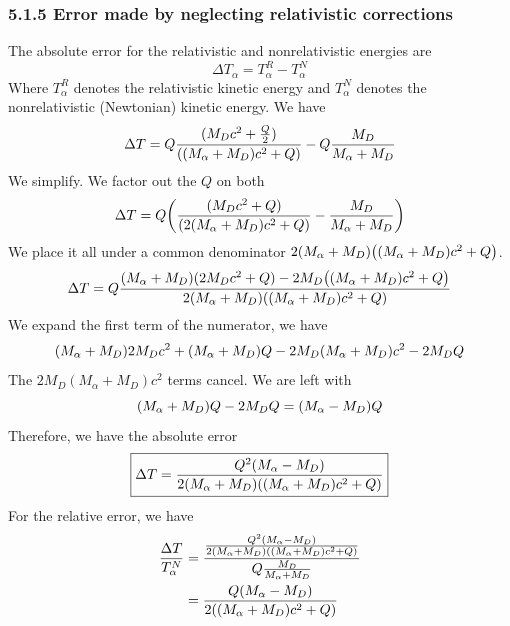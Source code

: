 \documentclass[12pt,a4paper]{article}
\begin{document}
\begin{solution_pset}
		\subsubsection*{5.1.5 Error made by neglecting relativistic corrections}
			\nocite{flores2026}
			The absolute error for the relativistic and nonrelativistic energies are
			\[
				\Delta T_\alpha = T_\alpha^R - T_\alpha^N
			\]
			Where $T_\alpha^R$ denotes the relativistic kinetic energy and $T_\alpha^N$
			denotes the nonrelativistic (Newtonian) kinetic energy. We have
			\[
				\Delta T = 
				Q
				\frac{
					(M_D c^2+\frac{Q}{2})
				}{
					\pqty{
						(M_\alpha + M_D)c^2 +Q
					} 
				} 
				-
				Q
				\frac{
					M_D
				}{
					M_\alpha + M_D
				} 
			\]
			We simplify. We factor out the $Q$ on both
			\[
				\Delta T =
				Q
				\pqty{
					\frac{
						(M_D c^2+Q)
					}{
						\pqty{
							2(M_\alpha + M_D)c^2 +Q
						} 
					} 
					-
					\frac{
						M_D
					}{
						M_\alpha + M_D
					} 
				}
			\]
			We place it all under a common denominator 
			$2(M_\alpha + M_D)\pqty{(M_\alpha + M_D) c^2 +Q}$.
			\[
				\Delta T =
				Q
				\frac{
						(M_\alpha + M_D)(2M_D c^2 +Q) - 2M_D
						\pqty{
							(M_\alpha + M_D) 
							c^2
							+
							Q
						}
					}{
						2(M_\alpha + M_D)\pqty{(M_\alpha + M_D) c^2 +Q}
				} 
			\]
			We expand the first term of the numerator, we have
			\[
				\pqty{
					M_\alpha 
					+
					M_D
				}
				2 M_D c^2
				+
				\pqty{
					M_\alpha 
					+
					M_D
				}
				Q
				-
				2M_D
				\pqty{
					M_\alpha 
					+
					M_D
				}
				c^2
				-
				2M_D Q
			\]
			The $2 M_D(M_\alpha + M_D)c^2$ terms cancel. We are left with
			\[
				\pqty{
					M_\alpha 
					+
					M_D
				}
				Q
				-
				2M_D Q
				=
				\pqty{
					M_\alpha 
					-
					M_D
				}
				Q
			\]
			Therefore, we have the absolute error
			\[
				\boxed{
					\Delta T 
					=
					\frac{
						Q^2
						\pqty{
							M_\alpha 
							-
							M_D
						}
					}{
						2(M_\alpha + M_D)\pqty{(M_\alpha + M_D) c^2 +Q}
					} 
				}
			\]
			For the relative error, we have
			\begin{align*}
				\frac{\Delta T}{T_\alpha^N} 
				&=
				\frac{
					\frac{
						Q^2
						\pqty{
							M_\alpha 
							-
							M_D
						}
					}{
						2(M_\alpha + M_D)\pqty{(M_\alpha + M_D) c^2 +Q}
					} 
				}{
					Q
					\frac{
						M_D
					}{
						M_\alpha + M_D
					} 
				} 
				\\
				&=
				\frac{
					Q 
					\pqty{
						M_\alpha 
						-
						M_D
					}
				}{
					2\pqty{(M_\alpha + M_D) c^2 +Q}
}
\end{align*}
\end{solution_pset}
\end{document}
